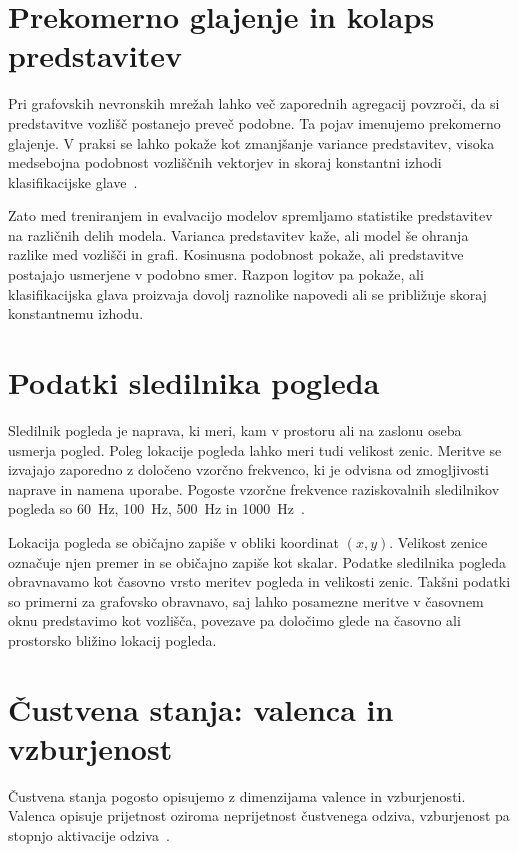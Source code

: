 \section{Prekomerno glajenje in kolaps predstavitev}
\label{subsec:oversmoothing}

Pri grafovskih nevronskih mrežah lahko več zaporednih agregacij povzroči, da si predstavitve vozlišč postanejo preveč podobne.
Ta pojav imenujemo prekomerno glajenje.
V praksi se lahko pokaže kot zmanjšanje variance predstavitev, visoka medsebojna podobnost vozliščnih vektorjev in skoraj konstantni izhodi klasifikacijske glave~\cite{ref_oversmoothing}.

Zato med treniranjem in evalvacijo modelov spremljamo statistike predstavitev na različnih delih modela.
Varianca predstavitev kaže, ali model še ohranja razlike med vozlišči in grafi.
Kosinusna podobnost pokaže, ali predstavitve postajajo usmerjene v podobno smer.
Razpon logitov pa pokaže, ali klasifikacijska glava proizvaja dovolj raznolike napovedi ali se približuje skoraj konstantnemu izhodu.

\section{Podatki sledilnika pogleda}
\label{subsec:eye-tracking}

Sledilnik pogleda je naprava, ki meri, kam v prostoru ali na zaslonu oseba usmerja pogled.
Poleg lokacije pogleda lahko meri tudi velikost zenic.
Meritve se izvajajo zaporedno z določeno vzorčno frekvenco, ki je odvisna od zmogljivosti naprave in namena uporabe.
Pogoste vzorčne frekvence raziskovalnih sledilnikov pogleda so 60~Hz, 100~Hz, 500~Hz in 1000~Hz~\cite{ref_eye_tracking_sampling}.

Lokacija pogleda se običajno zapiše v obliki koordinat $(x,y)$.
Velikost zenice označuje njen premer in se običajno zapiše kot skalar.
Podatke sledilnika pogleda obravnavamo kot časovno vrsto meritev pogleda in velikosti zenic.
Takšni podatki so primerni za grafovsko obravnavo, saj lahko posamezne meritve v časovnem oknu predstavimo kot vozlišča, povezave pa določimo glede na časovno ali prostorsko bližino lokacij pogleda.

\section{Čustvena stanja: valenca in vzburjenost}
\label{subsec:valenca-vzburjenje}

Čustvena stanja pogosto opisujemo z dimenzijama valence in vzburjenosti.
Valenca opisuje prijetnost oziroma neprijetnost čustvenega odziva, vzburjenost pa stopnjo aktivacije odziva~\cite{ref_valence_arousal}.

